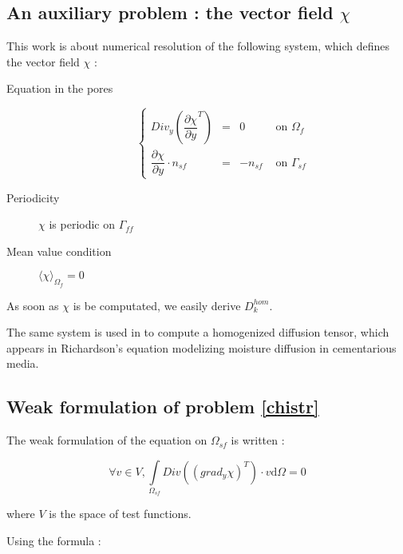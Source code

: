 \subsection{An auxiliary problem : the vector field $\chi$}

This work is about numerical resolution of the following system, which defines the vector field $\chi$ :

\begin{description}
\item[Equation in the pores] 
\begin{equation}\label{chistr}
\left\{%
\begin{array}{lccr}
Div_y \left( \dfrac{\partial{\chi}}{\partial{y}}^T\right) &=& 0&\text{ on }\Omega_f \\
\dfrac{\partial{\chi}}{\partial{y}} \cdot n_{sf}&=&-n_{sf}&\text{ on }\Gamma_{sf}
\end{array}
\right.
\end{equation}
\item[Periodicity] $\chi$ is periodic on $\Gamma_{ff}$
\item[Mean value condition] $\langle\chi\rangle_{\Omega_f}=0$
\end{description}

As soon as $\chi$ is be computated, we easily derive $D_k^{hom}$.

\ligneinter
The same system is used in \cite{WalMill16} to compute a homogenized diffusion tensor, %
which appears in Richardson's equation modelizing moisture diffusion in cementarious media.

\subsection{Weak formulation of problem \ref{chistr}}

The weak formulation of the equation on $\Omega_{sf}$ is written :

\[\forall v \in V , \int\limits_{\Omega_{sf}}Div\left(\left(grad_y \chi\right)^{T}\right)\cdot v\text{d}\Omega=0\]

where $V$ is the space of test functions.

\par
Using the formula :

